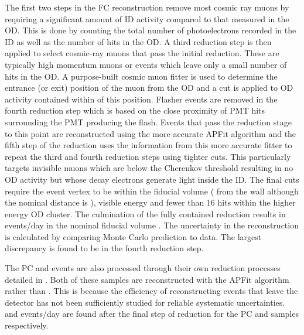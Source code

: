 The first two steps in the FC reconstruction remove most cosmic ray muons by requiring a significant amount of ID activity compared to that measured in the OD. This is done by counting the total number of photoelectrons recorded in the ID as well as the number of hits in the OD. A third reduction step is then applied to select cosmic-ray muons that pass the initial reduction. These are typically high momentum muons or events which leave only a small number of hits in the OD. A purpose-built cosmic muon fitter is used to determine the entrance (or exit) position of the muon from the OD and a cut is applied to OD activity contained within  of this position. Flasher events are removed in the fourth reduction step which is based on the close proximity of PMT hits surrounding the PMT producing the flash. Events that pass the reduction stage to this point are reconstructed using the more accurate APFit algorithm and the fifth step of the reduction uses the information from this more accurate fitter to repeat the third and fourth reduction steps using tighter cuts. This particularly targets invisible muons which are below the Cherenkov threshold resulting in no OD activity but whose decay electrons generate light inside the ID. The final cuts require the event vertex to be within the fiducial volume ( from the wall although the nominal distance is ), visible energy  and fewer than 16 hits within the higher energy OD cluster. The culmination of the fully contained reduction results in  events/day in the nominal fiducial volume \cite{thesis_miao}. The uncertainty in the reconstruction is calculated by comparing Monte Carlo prediction to data. The largest discrepancy is found to be  in the fourth reduction step.

The PC and  events are also processed through their own reduction processes detailed in \cite{Ashie_2005}. Both of these samples are reconstructed with the APFit algorithm rather than \fq. This is because the efficiency of reconstructing events that leave the detector has not been sufficiently studied for reliable systematic uncertainties.  and  events/day are found after the final step of reduction for the PC and  samples respectively.


